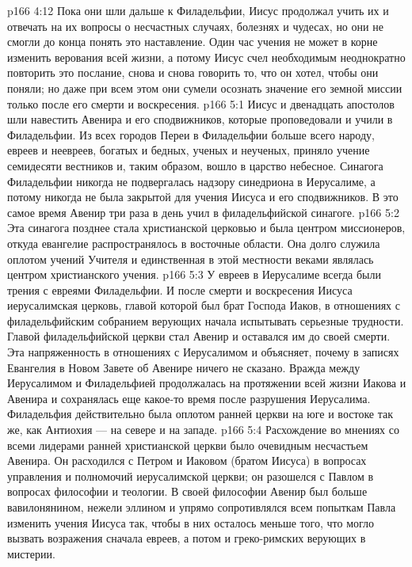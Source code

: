 \vs p166 4:12 \pc Пока они шли дальше к Филадельфии, Иисус продолжал учить их и отвечать на их вопросы о несчастных случаях, болезнях и чудесах, но они не смогли до конца понять это наставление. Один час учения не может в корне изменить верования всей жизни, а потому Иисус счел необходимым неоднократно повторить это послание, снова и снова говорить то, что он хотел, чтобы они поняли; но даже при всем этом они сумели осознать значение его земной миссии только после его смерти и воскресения.
\vs p166 5:1 Иисус и двенадцать апостолов шли навестить Авенира и его сподвижников, которые проповедовали и учили в Филадельфии. Из всех городов Переи в Филадельфии больше всего народу, евреев и неевреев, богатых и бедных, ученых и неученых, приняло учение семидесяти вестников и, таким образом, вошло в царство небесное. Синагога Филадельфии никогда не подвергалась надзору синедриона в Иерусалиме, а потому никогда не была закрытой для учения Иисуса и его сподвижников. В это самое время Авенир три раза в день учил в филадельфийской синагоге.
\vs p166 5:2 Эта синагога позднее стала христианской церковью и была центром миссионеров, откуда евангелие распространялось в восточные области. Она долго служила оплотом учений Учителя и единственная в этой местности веками являлась центром христианского учения.
\vs p166 5:3 У евреев в Иерусалиме всегда были трения с евреями Филадельфии. И после смерти и воскресения Иисуса иерусалимская церковь, главой которой был брат Господа Иаков, в отношениях с филадельфийским собранием верующих начала испытывать серьезные трудности. Главой филадельфийской церкви стал Авенир и оставался им до своей смерти. Эта напряженность в отношениях с Иерусалимом и объясняет, почему в записях Евангелия в Новом Завете об Авенире ничего не сказано. Вражда между Иерусалимом и Филадельфией продолжалась на протяжении всей жизни Иакова и Авенира и сохранялась еще какое\hyp{}то время после разрушения Иерусалима. Филадельфия действительно была оплотом ранней церкви на юге и востоке так же, как Антиохия --- на севере и на западе.
\vs p166 5:4 \pc Расхождение во мнениях со всеми лидерами ранней христианской церкви было очевидным несчастьем Авенира. Он расходился с Петром и Иаковом (братом Иисуса) в вопросах управления и полномочий иерусалимской церкви; он разошелся с Павлом в вопросах философии и теологии. В своей философии Авенир был больше вавилонянином, нежели эллином и упрямо сопротивлялся всем попыткам Павла изменить учения Иисуса так, чтобы в них осталось меньше того, что могло вызвать возражения сначала евреев, а потом и греко\hyp{}римских верующих в мистерии.
